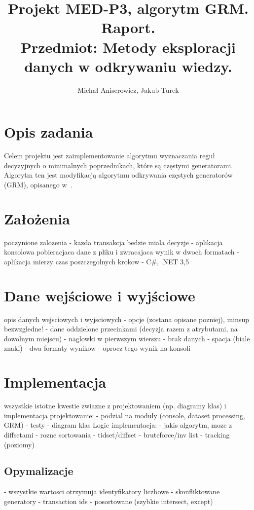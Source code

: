 \documentclass[a4paper,10pt]{article}
\title{Projekt MED-P3, algorytm GRM. Raport. \\ \small{Przedmiot: Metody eksploracji danych w odkrywaniu wiedzy.}}
\author{Michał Aniserowicz, Jakub Turek}
\date{}
\begin{document}
\maketitle

\section{Opis zadania}
Celem projektu jest zaimplementowanie algorytmu wyznaczania reguł decyzyjnych o minimalnych poprzednikach, które są częstymi generatorami.
Algorytm ten jest modyfikacją algorytmu odkrywania częstych generatorów (GRM), opisanego w~\cite{grm}.



\section{Założenia}
poczynione zalozenia
- kazda transakcja bedzie miala decyzje
- aplikacja konsolowa pobieracjaca dane z pliku i zwracajaca wynik w dwoch formatach
- aplikacja mierzy czas poszczegolnych krokow
- C\#, .NET 3,5



\section{Dane wejściowe i wyjściowe}
opis danych wejsciowych i wyjsciowych
- opcje (zostana opisane pozniej), minsup bezwzgledne!
- dane oddzielone przecinkami (decyzja razem z atrybutami, na dowolnym miejscu)
- naglowki w pierwszym wierszu
- brak danych - spacja (biale znaki)
- dwa formaty wynikow
- oprocz tego wynik na konsoli



\section{Implementacja}
wszystkie istotne kwestie zwiazne z projektowaniem (np. diagramy klas) i implementacja
projektowanie:
- podzial na moduly (console, dataset processing, GRM)
- testy
- diagram klas Logic
implementacja:
- jakis algorytm, moze z diffsetami
- rozne sortowania
- tidset/diffset
- bruteforce/inv list
- tracking (poziomy)

\subsection{Opymalizacje}
- wszystkie wartosci otrzymuja identyfikatory liczbowe
- skonfliktowane generatory
- transaction ids - posortowane (szybkie intersect, except)
\end{document}
